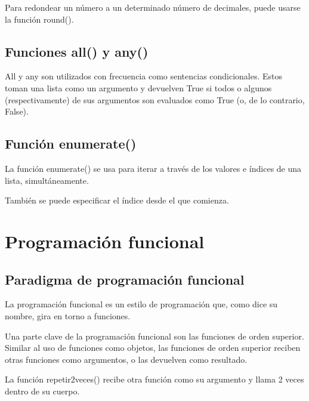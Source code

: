 \documentclass{report}
\begin{document}

Para redondear un número a un determinado número de decimales, puede usarse la función round().


\section{Funciones all() y any()}

All y any son utilizados con frecuencia como sentencias condicionales. Estos toman una lista como un argumento y devuelven True si todos o algunos (respectivamente) de sus argumentos son evaluados como True (o, de lo contrario, False).



\section{Función enumerate()}

La función enumerate() se usa para iterar a través de los valores e índices de una lista, simultáneamente.


También se puede especificar el índice desde el que comienza.


\clearpage\chapter{Programación funcional}

\section{Paradigma de programación funcional}

La programación funcional es un estilo de programación que, como dice su nombre, gira en torno a funciones.

Una parte clave de la programación funcional son las funciones de orden superior. Similar al uso de funciones como objetos, las funciones de orden superior reciben otras funciones como argumentos, o las devuelven como resultado.


La función repetir2veces() recibe otra función como su argumento y llama 2 veces dentro de su cuerpo.
\end{document}
